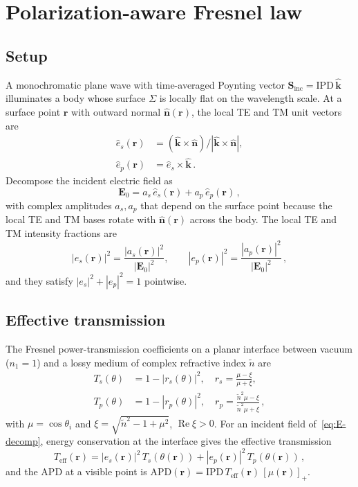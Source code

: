 \documentclass[journal,twocolumn,10pt]{IEEEtran}
\theoremstyle{plain}
\theoremstyle{remark}
\newcommand{\khat}{\hat{\bm{k}}}
\newcommand{\nhat}{\hat{\bm{n}}}
\newcommand{\rr}{\mathbf{r}}
\newcommand{\EE}{\mathbf{E}}
\newcommand{\IPD}{\mathrm{IPD}}
\newcommand{\APD}{\mathrm{APD}}
\newcommand{\Teff}{T_{\mathrm{eff}}}
\newcommand{\ntilde}{\tilde{n}}
\newcommand{\pospart}[1]{\left[#1\right]_{+}}
\DeclareMathOperator{\RE}{Re}
\begin{document}
\section{Polarization-aware Fresnel law}\label{si:fresnel}

\subsection{Setup}
A monochromatic plane wave with time-averaged Poynting vector
$\mathbf{S}_{\mathrm{inc}} = \IPD\,\khat$ illuminates a body whose
surface $\Sigma$ is locally flat on the wavelength scale. At a
surface point $\rr$ with outward normal $\nhat(\rr)$, the local TE
and TM unit vectors are
\begin{align}
  \hat{e}_s(\rr) &= (\khat \times \nhat) / |\khat \times \nhat|,
  \label{eq:es}\\
  \hat{e}_p(\rr) &= \hat{e}_s \times \khat\, .
  \label{eq:ep}
\end{align}
Decompose the incident electric field as
\begin{equation}\label{eq:E-decomp}
  \EE_0 = a_s\,\hat{e}_s(\rr) + a_p\,\hat{e}_p(\rr)\, ,
\end{equation}
with complex amplitudes $a_s, a_p$ that depend on the surface point
because the local TE and TM bases rotate with $\nhat(\rr)$ across
the body. The local TE and TM intensity fractions are
\begin{equation}\label{eq:e-fractions}
  |e_s(\rr)|^2 = \frac{|a_s(\rr)|^2}{|\EE_0|^2},
  \qquad
  |e_p(\rr)|^2 = \frac{|a_p(\rr)|^2}{|\EE_0|^2}\, ,
\end{equation}
and they satisfy $|e_s|^2 + |e_p|^2 = 1$ pointwise.

\subsection{Effective transmission}
The Fresnel power-transmission coefficients on a planar interface
between vacuum ($n_1 = 1$) and a lossy medium of complex refractive
index $\ntilde$ are
\begin{align}
  T_s(\theta)
  &= 1 - |r_s(\theta)|^2,
  \quad
  r_s = \frac{\mu - \xi}{\mu + \xi},
  \label{eq:Ts-SI}\\
  T_p(\theta)
  &= 1 - |r_p(\theta)|^2,
  \quad
  r_p = \frac{\ntilde^2\mu - \xi}{\ntilde^2\mu + \xi}\, ,
  \label{eq:Tp-SI}
\end{align}
with $\mu = \cos\theta_i$ and
$\xi = \sqrt{\ntilde^2 - 1 + \mu^2}$, $\RE\xi > 0$. For an incident
field of~\eqref{eq:E-decomp}, energy conservation at the interface
gives the effective transmission
\begin{equation}\label{eq:Teff-SI}
  \Teff(\rr) = |e_s(\rr)|^2\,T_s(\theta(\rr))
            + |e_p(\rr)|^2\,T_p(\theta(\rr))\, ,
\end{equation}
and the \gls{APD} at a visible point is
$\APD(\rr) = \IPD\,\Teff(\rr)\,\pospart{\mu(\rr)}$.
\end{document}
